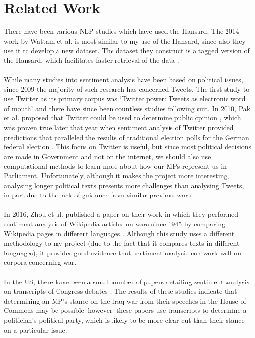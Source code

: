 \documentclass[12pt,a4paper,twoside,openright]{report}
\begin{document}
\section{Related Work} \label{intro-related}
There have been various NLP studies which have used the Hansard. The 2014 work by Wattam et al. is most similar to my use of the Hansard, since also they use it to develop a new dataset. The dataset they construct is a tagged version of the Hansard, which facilitates faster retrieval of the data \cite{hansardtagging}.
\\\\
While many studies into sentiment analysis have been based on political issues, since 2009 the majority of such research has concerned Tweets. The first study to use Twitter as its primary corpus was `Twitter power: Tweets as electronic word of mouth' \cite{first_twitter} and there have since been countless studies following suit. In 2010, Pak et al. proposed that Twitter could be used to determine public opinion \cite{twitter_as_a_corpus}, which was proven true later that year when sentiment analysis of Twitter provided predictions that paralleled the results of traditional election polls for the German federal election \cite{predicting_elections_twitter}. This focus on Twitter is useful, but since most political decisions are made in Government and not on the internet, we should also use computational methods to learn more about how our MPs represent us in Parliament. Unfortunately, although it makes the project more interesting, analysing longer political texts presents more challenges than analysing Tweets, in part due to the lack of guidance from similar previous work.
\\\\
In 2016, Zhou et al. published a paper on their work in which they performed sentiment analysis of Wikipedia articles on wars since 1945 by comparing Wikipedia pages in different languages \cite{wikipediawar}. Although this study uses a different methodology to my project (due to the fact that it compares texts in different languages), it provides good evidence that sentiment analysis can work well on corpora concerning war.
\\\\
In the US, there have been a small number of papers detailing sentiment analysis on transcripts of Congress debates \cite{rep_dem_one, rep_dem_two}. The results of these studies indicate that determining an MP's stance on the Iraq war from their speeches in the House of Commons may be possible, however, these papers use transcripts to determine a politician's political party, which is likely to be more clear-cut than their stance on a particular issue.
\end{document}
